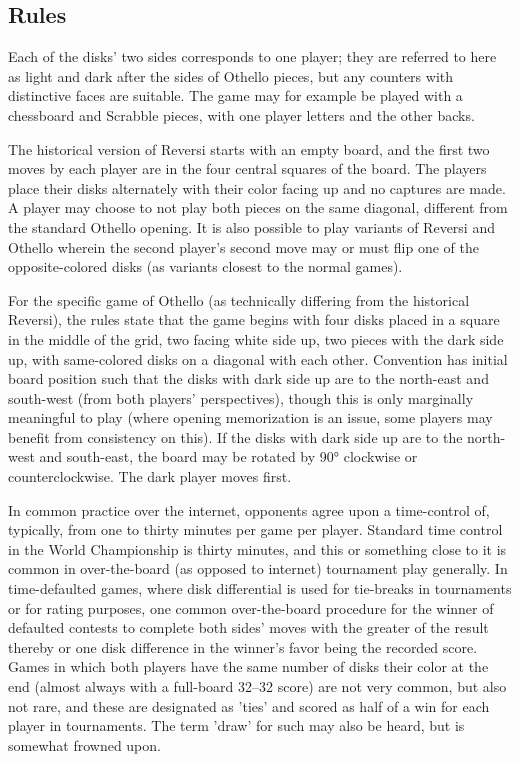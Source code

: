 \documentclass[a4paper]{report}
\begin{document}
\subsection{Rules}
Each of the disks' two sides corresponds to one player; they are referred to here as light and dark after the sides of Othello pieces, but any counters with distinctive faces are suitable. The game may for example be played with a chessboard and Scrabble pieces, with one player letters and the other backs. 
\par
The historical version of Reversi starts with an empty board, and the first two moves by each player are in the four central squares of the board. The players place their disks alternately with their color facing up and no captures are made. A player may choose to not play both pieces on the same diagonal, different from the standard Othello opening. It is also possible to play variants of Reversi and Othello wherein the second player's second move may or must flip one of the opposite-colored disks (as variants closest to the normal games). 
\par
For the specific game of Othello (as technically differing from the historical Reversi), the rules state that the game begins with four disks placed in a square in the middle of the grid, two facing white side up, two pieces with the dark side up, with same-colored disks on a diagonal with each other. Convention has initial board position such that the disks with dark side up are to the north-east and south-west (from both players' perspectives), though this is only marginally meaningful to play (where opening memorization is an issue, some players may benefit from consistency on this). If the disks with dark side up are to the north-west and south-east, the board may be rotated by 90° clockwise or counterclockwise. The dark player moves first. 
\par
In common practice over the internet, opponents agree upon a time-control of, typically, from one to thirty minutes per game per player. Standard time control in the World Championship is thirty minutes, and this or something close to it is common in over-the-board (as opposed to internet) tournament play generally. In time-defaulted games, where disk differential is used for tie-breaks in tournaments or for rating purposes, one common over-the-board procedure for the winner of defaulted contests to complete both sides' moves with the greater of the result thereby or one disk difference in the winner's favor being the recorded score. Games in which both players have the same number of disks their color at the end (almost always with a full-board 32–32 score) are not very common, but also not rare, and these are designated as 'ties' and scored as half of a win for each player in tournaments. The term 'draw' for such may also be heard, but is somewhat frowned upon. 
\end{document}
